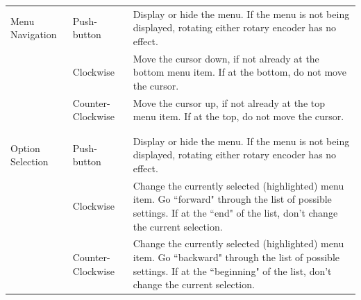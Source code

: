 \documentclass[titlepage]{scrartcl}
\begin{document}
	\begin{center}
    		\begin{tabular}{ p{3cm} p{3cm} p{10cm} }
		 Menu Navigation & Push-button & Display or hide the menu. If the menu is not being displayed, rotating either rotary encoder has no effect. \\
		 & Clockwise & Move the cursor down, if not already at the bottom menu item. If at the bottom, do not move the cursor.  \\
		 & Counter-Clockwise & Move the cursor up, if not already at the top menu item. If at the top, do not move the cursor. \\
		\\ \hline \\
		Option Selection & Push-button & Display or hide the menu. If the menu is not being displayed, rotating either rotary encoder has no effect. \\
		 & Clockwise & Change the currently selected (highlighted) menu item. Go ``forward" through the list of possible settings. If at the ``end" of the list, don't change the current selection. \\
		 & Counter-Clockwise & Change the currently selected (highlighted) menu item. Go ``backward" through the list of possible settings. If at the ``beginning" of the list, don't change the current selection. \\
		\end{tabular}
	\end{center}

	
	
\end{document}
